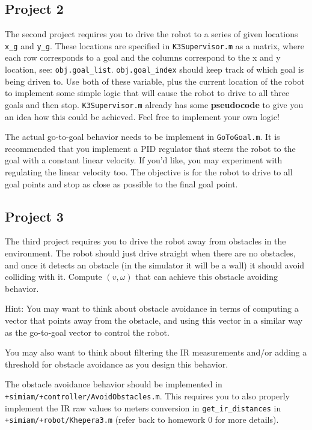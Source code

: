 \documentclass[10pt]{article}
\begin{document}
\subsection*{Project 2}
The second project requires you to drive the robot to a series of given locations \texttt{x\_g} and \texttt{y\_g}. These locations are specified in \texttt{K3Supervisor.m} as a matrix, where each row corresponds to a goal and the columns correspond to the x and y location, see: \texttt{obj.goal\_list}. \texttt{obj.goal\_index} should keep track of which goal is being driven to. Use both of these variable, plus the current location of the robot to implement some simple logic that will cause the robot to drive to all three goals and then stop. \texttt{K3Supervisor.m} already has some \textbf{pseudocode} to give you an idea how this could be achieved. Feel free to implement your own logic!

The actual go-to-goal behavior needs to be implement in \texttt{GoToGoal.m}. It is recommended that you implement a PID regulator that steers the robot to the goal with a constant linear velocity. If you'd like, you may experiment with regulating the linear velocity too. The objective is for the robot to drive to all goal points and stop as close as possible to the final goal point.

\subsection*{Project 3}
The third project requires you to drive the robot away from obstacles in the environment. The robot should just drive straight when there are no obstacles, and once it detects an obstacle (in the simulator it will be a wall) it should avoid colliding with it. Compute $(v,\omega)$ that can achieve this obstacle avoiding behavior.

Hint: You may want to think about obstacle avoidance in terms of computing a vector that points away from the obstacle, and using this vector in a similar way as the go-to-goal vector to control the robot.

You may also want to think about filtering the IR measurements and/or adding a threshold for obstacle avoidance as you design this behavior.

The obstacle avoidance behavior should be implemented in \texttt{+simiam/+controller/AvoidObstacles.m}. This requires you to also properly implement the IR raw values to meters conversion in \texttt{get\_ir\_distances} in \texttt{+simiam/+robot/Khepera3.m} (refer back to homework 0 for more details).
\end{document}
